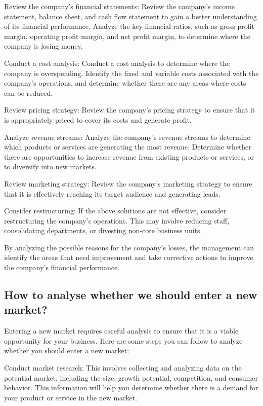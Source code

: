 \documentclass[12pt, a4paper, oneside]{article}
\begin{document}
Review the company's financial statements: Review the company's income statement, balance sheet, and cash flow statement to gain a better understanding of its financial performance. Analyze the key financial ratios, such as gross profit margin, operating profit margin, and net profit margin, to determine where the company is losing money.

Conduct a cost analysis: Conduct a cost analysis to determine where the company is overspending. Identify the fixed and variable costs associated with the company's operations, and determine whether there are any areas where costs can be reduced.

Review pricing strategy: Review the company's pricing strategy to ensure that it is appropriately priced to cover its costs and generate profit.

Analyze revenue streams: Analyze the company's revenue streams to determine which products or services are generating the most revenue. Determine whether there are opportunities to increase revenue from existing products or services, or to diversify into new markets.

Review marketing strategy: Review the company's marketing strategy to ensure that it is effectively reaching its target audience and generating leads.

Consider restructuring: If the above solutions are not effective, consider restructuring the company's operations. This may involve reducing staff, consolidating departments, or divesting non-core business units.

By analyzing the possible reasons for the company's losses, the management can identify the areas that need improvement and take corrective actions to improve the company's financial performance.

\subsection{ How to analyse whether we should enter a new market? }
Entering a new market requires careful analysis to ensure that it is a viable opportunity for your business. Here are some steps you can follow to analyze whether you should enter a new market:

Conduct market research: This involves collecting and analyzing data on the potential market, including the size, growth potential, competition, and consumer behavior. This information will help you determine whether there is a demand for your product or service in the new market.
\end{document}
